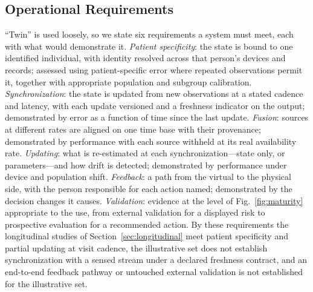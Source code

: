 \documentclass[journal]{IEEEtran}
\begin{document}
\subsection{Operational Requirements}
\label{sec:twinreq}
``Twin'' is used loosely, so we state six requirements a system must meet, each with what would demonstrate it. \emph{Patient specificity}: the state is bound to one identified individual, with identity resolved across that person's devices and records; assessed using patient-specific error where repeated observations permit it, together with appropriate population and subgroup calibration. \emph{Synchronization}: the state is updated from new observations at a stated cadence and latency, with each update versioned and a freshness indicator on the output; demonstrated by error as a function of time since the last update. \emph{Fusion}: sources at different rates are aligned on one time base with their provenance; demonstrated by performance with each source withheld at its real availability rate. \emph{Updating}: what is re-estimated at each synchronization---state only, or parameters---and how drift is detected; demonstrated by performance under device and population shift. \emph{Feedback}: a path from the virtual to the physical side, with the person responsible for each action named; demonstrated by the decision changes it causes. \emph{Validation}: evidence at the level of Fig.~\ref{fig:maturity} appropriate to the use, from external validation for a displayed risk to prospective evaluation for a recommended action. By these requirements the longitudinal studies of Section~\ref{sec:longitudinal} meet patient specificity and partial updating at visit cadence, the illustrative set does not establish synchronization with a sensed stream under a declared freshness contract, and an end-to-end feedback pathway or untouched external validation is not established for the illustrative set.
\end{document}
